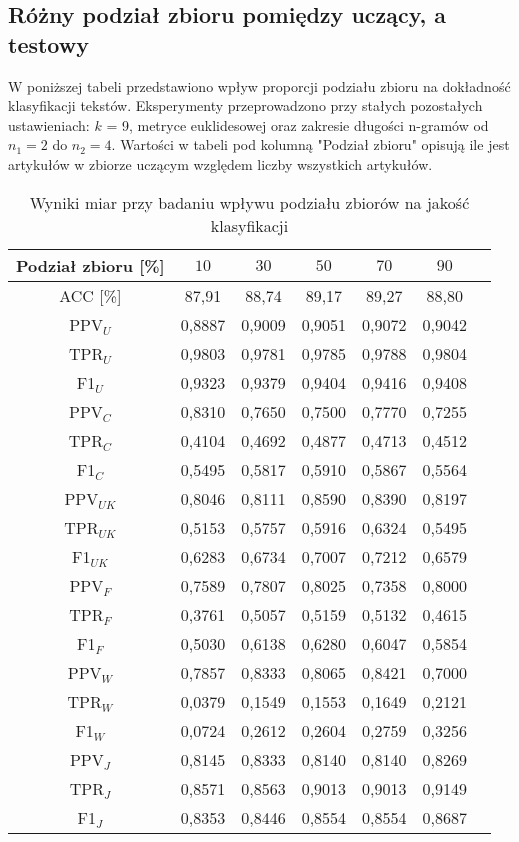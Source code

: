 \documentclass{article}
\begin{document}
\subsection{Różny podział zbioru pomiędzy uczący, a testowy}
W poniższej tabeli przedstawiono wpływ proporcji podziału zbioru na dokładność klasyfikacji tekstów. Eksperymenty przeprowadzono przy stałych pozostałych ustawieniach: \(k\) = 9, metryce euklidesowej oraz zakresie długości n-gramów od \(n_1 = 2\) do \(n_2 = 4\). Wartości w tabeli pod kolumną "Podział zbioru" opisują ile jest artykułów w zbiorze uczącym względem liczby wszystkich artykułów.

\begin{table}[H]
    \centering
    \begin{tabular}{|c|c|c|c|c|c|c}
    \hline
    \textbf{Podział zbioru [\%]} & \textbf{\(10\)} & \textbf{\(30\)} & \textbf{\(50\)} & \textbf{\(70\)}  & \textbf{\(90\)} \\ \hline
    ACC [\%] & 87,91 & 88,74 & 89,17 & 89,27 & 88,80\\ \hline
    PPV\(_U\) & 0,8887 & 0,9009 & 0,9051 & 0,9072 & 0,9042\\ \hline
    TPR\(_U\) & 0,9803 & 0,9781 & 0,9785 & 0,9788 & 0,9804\\ \hline
    F1\(_U\) & 0,9323 & 0,9379 & 0,9404 & 0,9416 & 0,9408\\ \hline
    PPV\(_C\) & 0,8310 & 0,7650 & 0,7500 & 0,7770 & 0,7255\\ \hline
    TPR\(_C\) & 0,4104 & 0,4692 & 0,4877 & 0,4713 & 0,4512\\ \hline
    F1\(_C\) & 0,5495 & 0,5817 & 0,5910 & 0,5867 & 0,5564\\ \hline
    PPV\(_{UK}\) & 0,8046 & 0,8111 & 0,8590& 0,8390 & 0,8197\\ \hline
    TPR\(_{UK}\) & 0,5153 & 0,5757 & 0,5916 & 0,6324 & 0,5495\\ \hline
    F1\(_{UK}\) & 0,6283 & 0,6734 & 0,7007 & 0,7212 & 0,6579\\ \hline
    PPV\(_F\) & 0,7589 & 0,7807 & 0,8025 & 0,7358 & 0,8000\\ \hline
    TPR\(_F\) & 0,3761 & 0,5057 & 0,5159 & 0,5132 & 0,4615\\ \hline
    F1\(_F\) & 0,5030 & 0,6138 & 0,6280 & 0,6047 & 0,5854\\ \hline
    PPV\(_W\) & 0,7857 & 0,8333 & 0,8065 & 0,8421 & 0,7000\\ \hline
    TPR\(_W\) & 0,0379 & 0,1549 & 0,1553 & 0,1649 & 0,2121\\ \hline
    F1\(_W\) & 0,0724 & 0,2612 & 0,2604 & 0,2759 & 0,3256\\ \hline
    PPV\(_J\) & 0,8145 & 0,8333 & 0,8140 & 0,8140 & 0,8269\\ \hline
    TPR\(_J\) & 0,8571 & 0,8563 & 0,9013 & 0,9013 & 0,9149\\ \hline
    F1\(_J\) & 0,8353 & 0,8446 & 0,8554 & 0,8554 & 0,8687\\ \hline
    \end{tabular}
    \caption{Wyniki miar przy badaniu wpływu podziału zbiorów na jakość klasyfikacji}
\end{table}
\end{document}
